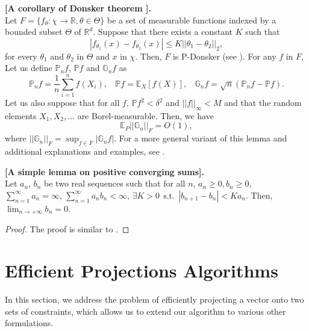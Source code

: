 \documentclass[twoside,11pt]{article}
\def\E{{\mathbb E}}
\def\O{{O}}
\def\PPP{{\mathbb P}}
\def\Real{{\mathbb R}}
\def\G{{\mathbb G}}
\def\st{~~\text{s.t.}~~}
\begin{document}
\begin{lemma}{\bf [A corollary of Donsker theorem \citealp[see][chap. 19.2, lemma
   19.36 and example 19.7]{vaart}].\\} \label{lemma:donsker}
   Let $F =\{ f_\theta: \chi \to \Real,  \theta \in \Theta \}$ be a
   set of measurable functions indexed by a bounded subset $\Theta$ of
   $\Real^d$. Suppose that there exists a constant $K$ such that
   \begin{displaymath}
      |f_{\theta_1}(x)-f_{\theta_2}(x)| \leq K ||\theta_1-\theta_2||_2,
   \end{displaymath}
   for every $\theta_1$ and $\theta_2$ in $\Theta$ and $x$ in $\chi$.
   Then, $F$ is P-Donsker (see \citealp[chap. 19.2]{vaart}).
   For any $f$ in $F$, Let us define $\PPP_n f$, $\PPP f$ and $\G_n f$ as
    \begin{displaymath}
       \PPP_n f = \frac{1}{n}\sum_{i=1}^n f(X_i), ~~~~  \PPP f = \E_X[f(X)], ~~~~ \G_n f = \sqrt{n}(\PPP_n f - \PPP f).
    \end{displaymath}
   Let us also suppose that for all $f$,
   $\PPP f^2 < \delta^2$ and $||f||_\infty < M$ and that the random elements
   $X_1,X_2,\ldots$ are Borel-measurable.
   Then, we have
   \begin{displaymath}
      \E_P||\G_n||_F = \O(1),
   \end{displaymath}
   where $||\G_n||_F = \sup_{f \in F} |\G_n f|$.
   For a more general variant of this
   lemma and additional explanations and examples, see \citet{vaart}.
\end{lemma}
\begin{lemma}{\bf [A simple lemma on positive converging sums].\\ } \label{lemma:converg}
   Let $a_n$, $b_n$ be two
   real sequences such that for all $n$, $a_n \geq 0, b_n \geq 0$, $\sum_{n=1}^\infty a_n = \infty$, $\sum_{n=1}^\infty a_n b_n < \infty$, $\exists K >0 \st |b_{n+1}-b_n| < K a_n$.
   Then, $\lim_{n \to +\infty} b_n = 0$.
\end{lemma}
\begin{proof}
    The proof is similar to \citet[prop 1.2.4]{bertsekas}.
\end{proof}

\section{Efficient Projections Algorithms} \label{appendix:proj}
In this section, we address the problem of efficiently projecting a vector
onto two sets of constraints, which allows us to extend our algorithm to
various other formulations.
\end{document}
